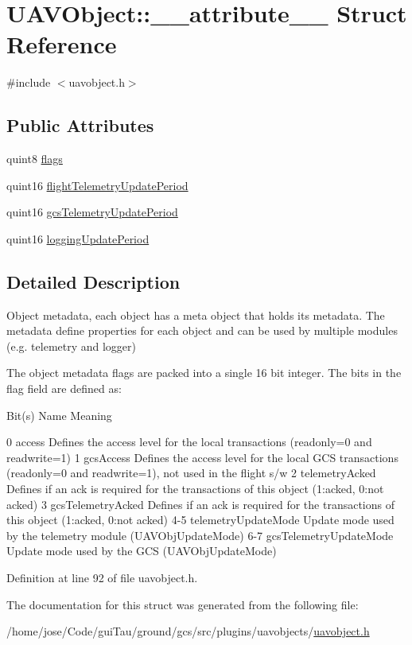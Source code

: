 \hypertarget{struct_u_a_v_object_1_1____attribute____}{\section{U\-A\-V\-Object\-:\-:\-\_\-\-\_\-attribute\-\_\-\-\_\- Struct Reference}
\label{struct_u_a_v_object_1_1____attribute____}
}


{\ttfamily \#include $<$uavobject.\-h$>$}

\subsection*{Public Attributes}
\begin{DoxyCompactItemize}
\item 
quint8 \hyperlink{group___u_a_v_objects_plugin_gaf5421bbd1e8748b9f0f12ba5b6722bdd}{flags}
\item 
quint16 \hyperlink{group___u_a_v_objects_plugin_gaa29a38fd35ce73e9e4afd2698de44797}{flight\-Telemetry\-Update\-Period}
\item 
quint16 \hyperlink{group___u_a_v_objects_plugin_ga3698244bb0c29537b3d26442624ee03b}{gcs\-Telemetry\-Update\-Period}
\item 
quint16 \hyperlink{group___u_a_v_objects_plugin_gad4c54f8af5beeb9dc2bbe402c9f01299}{logging\-Update\-Period}
\end{DoxyCompactItemize}


\subsection{Detailed Description}
Object metadata, each object has a meta object that holds its metadata. The metadata define properties for each object and can be used by multiple modules (e.\-g. telemetry and logger)

The object metadata flags are packed into a single 16 bit integer. The bits in the flag field are defined as\-:

Bit(s) Name Meaning 

 0 access Defines the access level for the local transactions (readonly=0 and readwrite=1) 1 gcs\-Access Defines the access level for the local G\-C\-S transactions (readonly=0 and readwrite=1), not used in the flight s/w 2 telemetry\-Acked Defines if an ack is required for the transactions of this object (1\-:acked, 0\-:not acked) 3 gcs\-Telemetry\-Acked Defines if an ack is required for the transactions of this object (1\-:acked, 0\-:not acked) 4-\/5 telemetry\-Update\-Mode Update mode used by the telemetry module (U\-A\-V\-Obj\-Update\-Mode) 6-\/7 gcs\-Telemetry\-Update\-Mode Update mode used by the G\-C\-S (U\-A\-V\-Obj\-Update\-Mode) 

Definition at line 92 of file uavobject.\-h.



The documentation for this struct was generated from the following file\-:\begin{DoxyCompactItemize}
\item 
/home/jose/\-Code/gui\-Tau/ground/gcs/src/plugins/uavobjects/\hyperlink{uavobject_8h}{uavobject.\-h}\end{DoxyCompactItemize}
